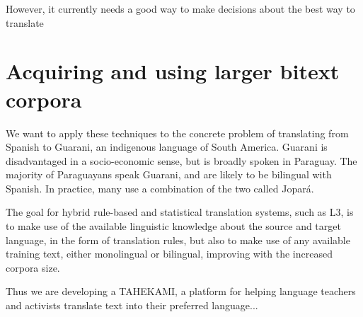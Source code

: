 \documentclass{article}
\begin{document}
However, it currently needs a good way to make decisions about the best way to
translate 

\section{Acquiring and using larger bitext corpora}
We want to apply these techniques to the concrete problem of translating from
Spanish to Guarani, an indigenous language of South America. Guarani is
disadvantaged in a socio-economic sense, but is broadly spoken in Paraguay. The
majority of Paraguayans speak Guarani, and are likely to be bilingual with
Spanish. In practice, many use a combination of the two called Jopar{\'a}.

The goal for hybrid rule-based and statistical translation systems, such as L3,
is to make use of the available linguistic knowledge about the source and
target language, in the form of translation rules, but also to make use of any
available training text, either monolingual or bilingual, improving with the
increased corpora size.

Thus we are developing a TAHEKAMI, a platform for helping language teachers and
activists translate text into their preferred language...



{}
\end{document}
